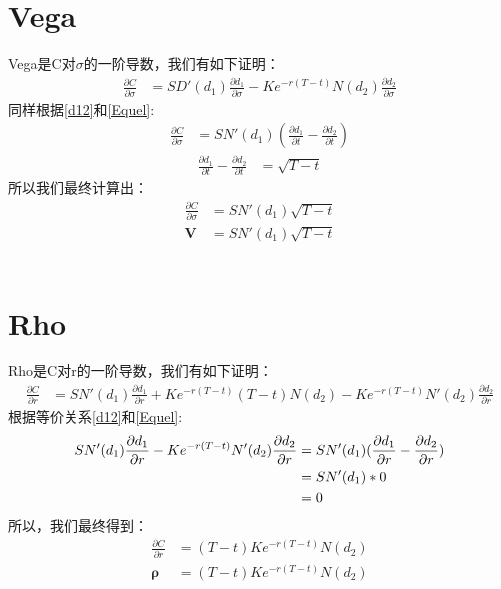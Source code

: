 \documentclass{ctexart}
\begin{document}
    
    \section{Vega}
    \noindent Vega是C对$\sigma$的一阶导数，我们有如下证明：
    \begin{align}
        \frac{\partial C}{\partial \sigma} & = SD'(d_1)\frac{\partial d_1}{\partial \sigma} - Ke^{-r(T-t)}N(d_2)\frac{\partial d_2}{\partial \sigma}
    \end{align}
    同样根据\eqref{d12}和\eqref{Equel}:
    \begin{align}
        \frac{\partial C}{\partial \sigma} & = SN'(d_1)(\frac{\partial d_1}{\partial t}-\frac{\partial d_2}{\partial t})
    \end{align}
    \begin{align}
        \frac{\partial d_1}{\partial t}-\frac{\partial d_2}{\partial t} & = \sqrt{T-t}
    \end{align}
    所以我们最终计算出：
    \begin{align}
        \frac{\partial C}{\partial \sigma} & = SN'(d_1)\sqrt{T-t}\\
        \boldsymbol{V} & = SN'(d_1)\sqrt{T-t}
    \end{align}\\

    
    
    \section{Rho}
    \noindent Rho是C对r的一阶导数，我们有如下证明：
    \begin{align}
        \frac{\partial C}{\partial r} & = SN'(d_1)\frac{\partial d_1}{\partial r}+Ke^{-r(T-t)}(T-t)N(d_2)-Ke^{-r(T-t)}N'(d_2)\frac{\partial d_2}{\partial r}
    \end{align}
    根据等价关系\eqref{d12}和\eqref{Equel}:
    \begin{align}
        SN'(d_1)\frac{\partial d_1}{\partial r} - Ke^{-r(T-t)}N'(d_2)\frac{\partial d_2}{\partial r} &= SN'(d_1)(\frac{\partial d_1}{\partial r}-\frac{\partial d_2}{\partial r})\notag \\
        & = SN'(d_1) * 0\notag \\
        & = 0
    \end{align}
    所以，我们最终得到：
    \begin{align}
        \frac{\partial C}{\partial r} & = (T-t)Ke^{-r(T-t)}N(d_2)\\
        \boldsymbol{\rho} & = (T-t)Ke^{-r(T-t)}N(d_2)
    \end{align}
    \newpage
\end{document}
